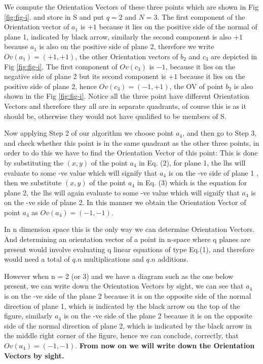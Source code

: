 \documentclass[english]{article}
\begin{document}
We compute the Orientation Vectors of these three points which are
shown in Fig \ref{fig:fig-i}. and store in S and put $q=2$ and $N=3$.
The first component of the Orientation vector of $a_1$ is $+1$ because it lies on the positive side of the normal of plane 1, indicated by black arrow, similarly the second component is also $+1$ because $a_1$ is also on the positive side of plane 2, therefore we write $Ov(a_1)=(+1,+1) $, the other Orientation vectors of $b_2$ and $c_3$ are depicted in Fig \ref{fig:fig-i}. The first component of $Ov(c_3)$ is $-1$, because it lies on the negative side of plane 2 but its second component is $+1$ because it lies on the positive side of plane 2, hence $Ov(c_3)=(-1,+1)$, the OV of point $b_2$ is also shown in the Fig \ref{fig:fig-i}.
Notice all the three point have different Orientation Vectors and therefore they all are in separate quadrants, of course this is as it should be, otherwise they would not have qualified to be members of S. 
 
Now applying
Step 2 of our algorithm we choose point $a_{4}$, and then go to Step
3, and check whether this point is in the same quadrant as the other
three points, in order to do this we have to find the Orientation
Vector of this point: This is done by substituting the $(x,y)$ of
the point $a_{4}$ in Eq. (2), for plane 1, the lhs will evaluate
to some -ve value which will signify that $a_{4}$ is on the -ve side
of plane 1 , then we substitute $(x,y)$ of the point $a_{4}$ in
Eq. (3) which is the equation for plane 2, the lhs will again evaluate
to some -ve value which will signify that $a_{4}$ is on the -ve side
of plane 2. In this manner we obtain the Orientation Vector  of point $a_{4}$
as $Ov(a_4) =(-1,-1)$. 

In n dimension space this is the only way we can determine
Orientation Vectors. And determining an orientation vector of a point
in n-space where q planes are present would involve evaluating q linear
equations of type Eq.(1), and therefore would need a total of $q.n$
multiplications and $q.n$ additions.

 However when n = 2 (or 3) and
we have a diagram such as the one below present, we can write down
the Orientation Vectors by sight, we can see
that $a_{4}$ is on the -ve side of the plane 2 because it is on the
opposite side of the normal direction of plane 1, which is indicated
by the black arrow on the top of the figure, similarly $a_{4}$ is
on the -ve side of the plane 2 because it is on the opposite side
of the normal direction of plane 2, which is indicated by the black
arrow in the middle right corner of the figure, hence we can conclude, correctly, that $Ov(a_4) =(-1,-1)$. \textbf{From now on
we will write down the Orientation Vectors by sight. }
\end{document}
